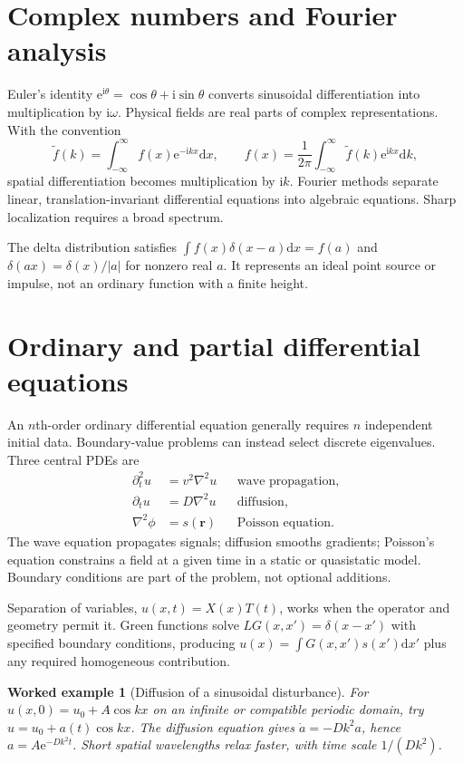 \documentclass[11pt,oneside]{book}
\newcommand{\dd}{\mathrm{d}}
\newcommand{\ii}{\mathrm{i}}
\newcommand{\ee}{\mathrm{e}}
\newcommand{\vect}[1]{\boldsymbol{#1}}
\newcommand{\lap}{\nabla^2}
\theoremstyle{reviewstyle}
\newtheorem{example}{Worked example}[chapter]
\begin{document}
\section{Complex numbers and Fourier analysis}
Euler's identity $\ee^{\ii\theta}=\cos\theta+\ii\sin\theta$ converts sinusoidal differentiation into multiplication by $\ii\omega$. Physical fields are real parts of complex representations. With the convention
\begin{equation}
\widetilde f(k)=\int_{-\infty}^{\infty}f(x)\ee^{-\ii kx}\dd x,
\qquad
f(x)=\frac{1}{2\pi}\int_{-\infty}^{\infty}\widetilde f(k)\ee^{\ii kx}\dd k,
\end{equation}
spatial differentiation becomes multiplication by $\ii k$. Fourier methods separate linear, translation-invariant differential equations into algebraic equations. Sharp localization requires a broad spectrum.

The delta distribution satisfies $\int f(x)\delta(x-a)\dd x=f(a)$ and $\delta(ax)=\delta(x)/|a|$ for nonzero real $a$. It represents an ideal point source or impulse, not an ordinary function with a finite height.
\section{Ordinary and partial differential equations}
An $n$th-order ordinary differential equation generally requires $n$ independent initial data. Boundary-value problems can instead select discrete eigenvalues. Three central PDEs are
\begin{align}
\partial_t^2u&=v^2\lap u &&\text{wave propagation},\\
\partial_tu&=D\lap u &&\text{diffusion},\\
\lap\phi&=s(\vect r) &&\text{Poisson equation}.
\end{align}
The wave equation propagates signals; diffusion smooths gradients; Poisson's equation constrains a field at a given time in a static or quasistatic model. Boundary conditions are part of the problem, not optional additions.

Separation of variables, $u(x,t)=X(x)T(t)$, works when the operator and geometry permit it. Green functions solve $LG(x,x')=\delta(x-x')$ with specified boundary conditions, producing
$u(x)=\int G(x,x')s(x')\dd x'$ plus any required homogeneous contribution.
\begin{example}[Diffusion of a sinusoidal disturbance]
For $u(x,0)=u_0+A\cos kx$ on an infinite or compatible periodic domain, try $u=u_0+a(t)\cos kx$. The diffusion equation gives $\dot a=-Dk^2a$, hence $a=A\ee^{-Dk^2t}$. Short spatial wavelengths relax faster, with time scale $1/(Dk^2)$.
\end{example}
\end{document}

